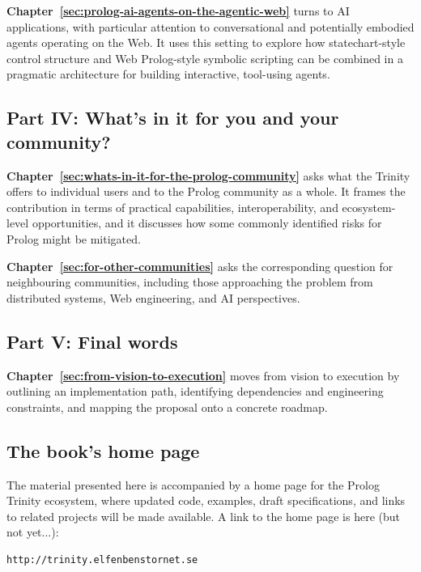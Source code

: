 \medskip
\noindent \textbf{Chapter~\ref{sec:prolog-ai-agents-on-the-agentic-web}} turns to AI applications, with particular attention to conversational and potentially embodied agents operating on the Web. It uses this setting to explore how statechart-style control structure and Web Prolog-style symbolic scripting can be combined in a pragmatic architecture for building interactive, tool-using agents.

\subsection*{Part IV: What's in it for you and your community?}

\textbf{Chapter~\ref{sec:whats-in-it-for-the-prolog-community}} asks what the Trinity offers to individual users and to the Prolog community as a whole. It frames the contribution in terms of practical capabilities, interoperability, and ecosystem-level opportunities, and it discusses how some commonly identified risks for Prolog might be mitigated.

\medskip
\noindent \textbf{Chapter~\ref{sec:for-other-communities}} asks the corresponding question for neighbouring communities, including those approaching the problem from distributed systems, Web engineering, and AI perspectives.

\subsection*{Part V: Final words}

\textbf{Chapter~\ref{sec:from-vision-to-execution}} moves from vision to execution by outlining an implementation path, identifying dependencies and engineering constraints, and mapping the proposal onto a concrete roadmap.

\subsection{The book's home page}

The material presented here is accompanied by a home page for the Prolog Trinity ecosystem, where updated code, examples, draft specifications, and links to related projects will be made available. A link to the home page is here (but not yet...):

\begin{verbatim}
http://trinity.elfenbenstornet.se
\end{verbatim}


